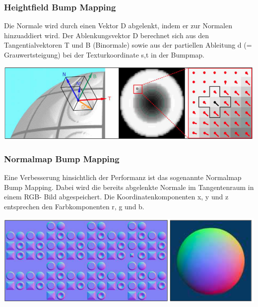 \documentclass[10pt]{article}
\begin{document}
\subsubsection{Heightfield Bump Mapping}
Die Normale wird durch einen Vektor D abgelenkt, indem er zur Normalen hinzuaddiert wird. Der Ablenkungsvektor D berechnet sich aus den Tangentialvektoren T und B (Binormale) sowie aus der partiellen Ableitung d (= Grauwertsteigung) bei der Texturkoordinate s,t in der Bumpmap.
\begin{center}
	\includegraphics[scale=0.4]{heightfield_bump_mapping.png}
\end{center}
\subsubsection{Normalmap Bump Mapping}
Eine Verbesserung hinsichtlich der Performanz ist das sogenannte Normalmap Bump Mapping. Dabei wird die bereits abgelenkte Normale im Tangentenraum in einem RGB- Bild abgespeichert. Die Koordinatenkomponenten x, y und z entsprechen den Farbkomponenten r, g und b.
\begin{center}
	\includegraphics[scale=0.4]{normalmap_bump_mapping.png}
\end{center}
\end{document}
